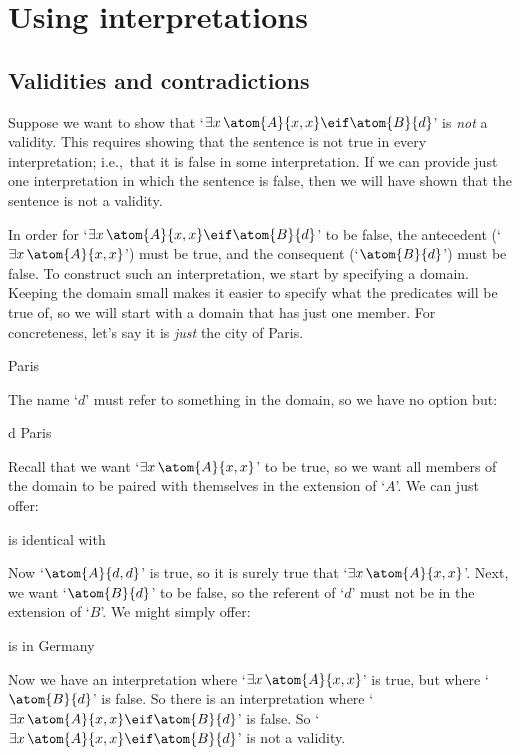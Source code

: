 \chapter{Using interpretations}
\label{sec.UsingModels}

\section{Validities and contradictions}
Suppose we want to show that `$\exists x\, \atom{A}{x,x} \eif \atom{B}{d}$' is \emph{not} a validity. This requires showing that the sentence is not true in every interpretation; i.e.,\ that it is false in some interpretation. If we can provide just one interpretation in which the sentence is false, then we will have shown that the sentence is not a validity.

In order for `$\exists x\,\atom{A}{x,x} \eif \atom{B}{d}$' to be false, the antecedent (`$\exists x\, \atom{A}{x,x}$') must be true, and the consequent (`$\atom{B}{d}$') must be false. To construct such an interpretation, we start by specifying a domain. Keeping the domain small makes it easier to specify what the predicates will be true of, so we will start with a domain that has just one member. For concreteness, let's say it is \emph{just} the city of Paris.
	\begin{ekey}
		\item[\text{domain}] Paris
	\end{ekey}
The name `$d$' must refer to something in the domain, so we have no option but:
	\begin{ekey}
		\item[d] Paris
	\end{ekey}
Recall that we want `$\exists x\, \atom{A}{x,x}$' to be true, so we want all members of the domain to be paired with themselves in the extension of `$A$'. We can just offer:
	\begin{ekey}
		\item[\atom{A}{x,y}]  is identical with 
	\end{ekey}
Now `$\atom{A}{d,d}$' is true, so it is surely true that `$\exists x\, \atom{A}{x,x}$'. Next, we want `$\atom{B}{d}$' to be false, so the referent of `$d$' must not be in the extension of `$B$'. We might simply offer:
	\begin{ekey}
		\item[\atom{B}{x}]  is in Germany
	\end{ekey}
Now we have an interpretation where `$\exists x\, \atom{A}{x,x}$' is true, but where `$\atom{B}{d}$' is false. So there is an interpretation where `$\exists x\, \atom{A}{x,x} \eif \atom{B}{d}$' is false. So `$\exists x\, \atom{A}{x,x} \eif \atom{B}{d}$' is not a validity.

